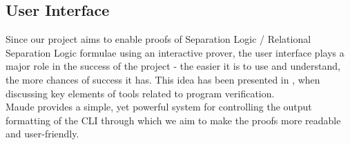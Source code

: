 \documentclass[12pt,a4paper]{article}
\begin{document}
\subsection{User Interface}
Since our project aims to enable proofs of Separation Logic / Relational Separation Logic formulae using an interactive prover, the user interface plays a major role in the success of the project - the easier it is to use and understand, the more chances of success it has. This idea has been presented in \cite{primer}, when discussing key elements of tools related to program verification. \\

Maude provides a simple, yet powerful system for controlling the output formatting of the CLI through which we aim to make the proofs more readable and user-friendly. \\
\end{document}
